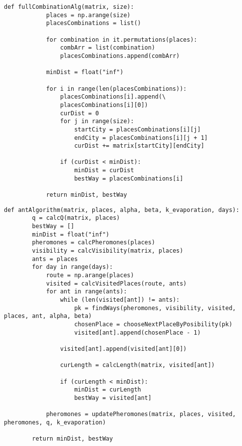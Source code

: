 \clearpage

\begin{center}
	\captionsetup{justification=raggedright,singlelinecheck=off}
	\begin{lstlisting}[label=lst:full_comb,caption=Реализация алгоритма полного перебора путей]
		def fullCombinationAlg(matrix, size):
			places = np.arange(size)
			placesCombinations = list()
			
			for combination in it.permutations(places):
				combArr = list(combination)
				placesCombinations.append(combArr)
			
			minDist = float("inf")
			
			for i in range(len(placesCombinations)):
				placesCombinations[i].append(\
				placesCombinations[i][0])
				curDist = 0
				for j in range(size):
					startCity = placesCombinations[i][j]
					endCity = placesCombinations[i][j + 1]
					curDist += matrix[startCity][endCity]
				
				if (curDist < minDist):
					minDist = curDist
					bestWay = placesCombinations[i]
			
			return minDist, bestWay
	\end{lstlisting}
\end{center}

\clearpage

\begin{center}
	\captionsetup{justification=raggedright,singlelinecheck=off}
	\begin{lstlisting}[label=lst:ant_alg,caption=Реализация муравьиного алгоритма]
	def antAlgorithm(matrix, places, alpha, beta, k_evaporation, days):
		q = calcQ(matrix, places)
		bestWay = []
		minDist = float("inf")
		pheromones = calcPheromones(places)
		visibility = calcVisibility(matrix, places)
		ants = places
		for day in range(days):
			route = np.arange(places)
			visited = calcVisitedPlaces(route, ants)
			for ant in range(ants):
				while (len(visited[ant]) != ants):
					pk = findWays(pheromones, visibility, visited, places, ant, alpha, beta)
					chosenPlace = chooseNextPlaceByPosibility(pk)
					visited[ant].append(chosenPlace - 1)
				
				visited[ant].append(visited[ant][0])
				
				curLength = calcLength(matrix, visited[ant])
				
				if (curLength < minDist):
					minDist = curLength
					bestWay = visited[ant]
				
			pheromones = updatePheromones(matrix, places, visited, pheromones, q, k_evaporation)
		
		return minDist, bestWay
	\end{lstlisting}
\end{center}


